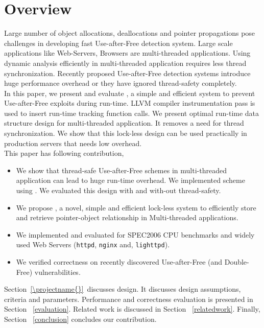 \section{Overview} \label{Overview}

Large number of object allocations, deallocations and pointer propagations pose challenges in developing fast Use-after-Free detection system. Large scale applications like Web-Servers, Browsers are multi-threaded applications. Using dynamic analysis efficiently in multi-threaded application requires less thread synchronization. Recently proposed Use-after-Free detection systems introduce huge performance overhead or they have ignored thread-safety completely. \\

In this paper, we present and evaluate \projectname{}, a simple and efficient system to prevent Use-after-Free exploits during run-time. LLVM compiler instrumentation pass is used to insert run-time tracking function calls. We present optimal run-time data structure design for multi-threaded application. It removes a need for thread synchronization. We show that this lock-less design can be used practically in production servers that needs low overhead. \\
 
This paper has following contribution,
\begin{itemize}
\item We show that thread-safe Use-after-Free schemes in multi-threaded application can lead to huge run-time overhead. We implemented \freesentry{} scheme using \metalloc{}. We evaluated this design with and with-out thread-safety.
\item We propose \projectname{}, a novel, simple and efficient lock-less system to efficiently store and retrieve pointer-object relationship in Multi-threaded applications.
\item We implemented and evaluated \projectname{} for SPEC2006 CPU benchmarks and widely used Web Servers (\texttt{httpd}, \texttt{nginx} and, \texttt{lighttpd}).
\item We verified \projectname{} correctness on recently discovered Use-after-Free (and Double-Free) vulnerabilities.
\end{itemize}

Section~\ref{\projectname{}}\ discusses \projectname{} design. It discusses design assumptions, criteria and parameters. Performance and correctness evaluation is presented in Section ~\ref{evaluation}. Related work is discussed in Section ~\ref{relatedwork}. Finally, Section ~\ref{conclusion} concludes our contribution. 